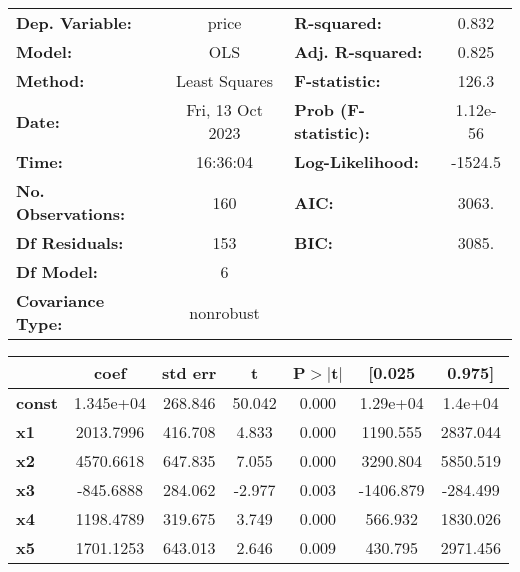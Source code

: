 \begin{center}
\begin{tabular}{lclc}
\toprule
\textbf{Dep. Variable:}    &      price       & \textbf{  R-squared:         } &     0.832   \\
\textbf{Model:}            &       OLS        & \textbf{  Adj. R-squared:    } &     0.825   \\
\textbf{Method:}           &  Least Squares   & \textbf{  F-statistic:       } &     126.3   \\
\textbf{Date:}             & Fri, 13 Oct 2023 & \textbf{  Prob (F-statistic):} &  1.12e-56   \\
\textbf{Time:}             &     16:36:04     & \textbf{  Log-Likelihood:    } &   -1524.5   \\
\textbf{No. Observations:} &         160      & \textbf{  AIC:               } &     3063.   \\
\textbf{Df Residuals:}     &         153      & \textbf{  BIC:               } &     3085.   \\
\textbf{Df Model:}         &           6      & \textbf{                     } &             \\
\textbf{Covariance Type:}  &    nonrobust     & \textbf{                     } &             \\
\bottomrule
\end{tabular}
\begin{tabular}{lcccccc}
               & \textbf{coef} & \textbf{std err} & \textbf{t} & \textbf{P$> |$t$|$} & \textbf{[0.025} & \textbf{0.975]}  \\
\midrule
\textbf{const} &    1.345e+04  &      268.846     &    50.042  &         0.000        &     1.29e+04    &      1.4e+04     \\
\textbf{x1}    &    2013.7996  &      416.708     &     4.833  &         0.000        &     1190.555    &     2837.044     \\
\textbf{x2}    &    4570.6618  &      647.835     &     7.055  &         0.000        &     3290.804    &     5850.519     \\
\textbf{x3}    &    -845.6888  &      284.062     &    -2.977  &         0.003        &    -1406.879    &     -284.499     \\
\textbf{x4}    &    1198.4789  &      319.675     &     3.749  &         0.000        &      566.932    &     1830.026     \\
\textbf{x5}    &    1701.1253  &      643.013     &     2.646  &         0.009        &      430.795    &     2971.456     \\

\end{tabular}
\end{center}
